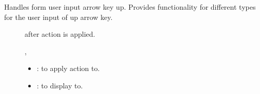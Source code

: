 \documentclass[letterpaper,10pt,english]{sphinxmanual}
\begin{document}
\begin{fulllineitems}
\begin{fulllineitems}
\begin{description}
\begin{itemize}
\end{itemize}

\end{description}


\end{fulllineitems}


\begin{fulllineitems}
\label{\detokenize{index:_CPPv2N7ostendo7UpArrowE3Var6Window}}%
\pysigstartmultiline
{}\label{\detokenize{index:Pessumnamespaceostendo_1abd61a4387f4057a821127c78c5de14df}}%
\pysigstopmultiline
Handles form user input arrow key up. Provides functionality for different {\hyperref[\detokenize{index:Pessumstructostendo_1_1Var}]{}} types for the user input of up arrow key. \begin{description}
\item[{}] \leavevmode
{\hyperref[\detokenize{index:Pessumstructostendo_1_1Var}]{}} after action is applied. 

\item[{}] \leavevmode
{\hyperref[\detokenize{index:Pessumstructostendo_1_1Var}]{}}, {\hyperref[\detokenize{index:Pessumclassostendo_1_1Window}]{}} 

\item[{}] \leavevmode\begin{itemize}
\item {} 
: {\hyperref[\detokenize{index:Pessumstructostendo_1_1Var}]{}} to apply action to. 

\item {} 
: {\hyperref[\detokenize{index:Pessumclassostendo_1_1Window}]{}} to display to. 

\end{itemize}


\end{description}
\end{fulllineitems}
\end{fulllineitems}
\end{document}

